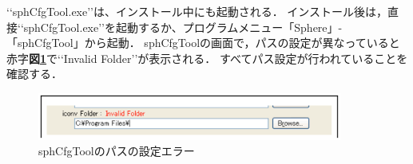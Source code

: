 \lq\lq sphCfgTool.exe\rq\rq は、インストール中にも起動される．
インストール後は，直接\lq\lq sphCfgTool.exe\rq\rq を起動するか、プログラムメニュー「Sphere」-「sphCfgTool」から起動．
sphCfgToolの画面で，パスの設定が異なっていると赤字\textbf{図\ref{fig:sphCfgTool error}}で\lq\lq Invalid Folder\rq\rq が表示される．
すべてパス設定が行われていることを確認する．

\begin{figure}[htbp]
\begin{center}
\includegraphics[width=10cm,clip]{error.eps}
\end{center}
\caption{sphCfgToolのパスの設定エラー}
\label{fig:sphCfgTool error}
\end{figure}




